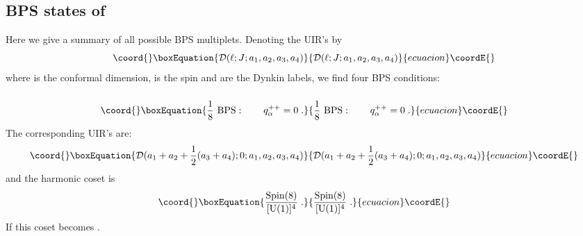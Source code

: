 \documentclass[a4paper,12pt]{article}
\begin{document}
\subsection{BPS states of \coordHE{}}

Here we give a summary of all possible 
\coordHE{} BPS multiplets. Denoting the UIR's by 
\begin{equation}\coord{}\boxEquation{\label{7.39}
  {\cal D}(\ell;J;a_1,a_2,a_3,a_4)
}{{\cal D}(\ell;J;a_1,a_2,a_3,a_4)
}{ecuacion}\coordE{}\end{equation}
where \myHighlight{$\ell$}\coordHE{} is the conformal dimension, \coordHE{} is the spin and 
\coordHE{} are the \coordHE{} Dynkin labels, we find 
four BPS conditions: 

\subsubsection{} 

\begin{equation}\coord{}\boxEquation{\label{8.14}
  {1\over 8}\ \mbox{BPS}:\qquad  q_\alpha^{++} =0\;.  
}{{1\over 8}\ \mbox{BPS}:\qquad  q_\alpha^{++} =0\;.  
}{ecuacion}\coordE{}\end{equation}
The corresponding UIR's are: 
\begin{equation}\coord{}\boxEquation{\label{8.15}
  {\cal D}(a_1+a_2 + {1\over 2}(a_3+a_4);0;a_1,a_2,a_3,a_4)
}{{\cal D}(a_1+a_2 + {1\over 2}(a_3+a_4);0;a_1,a_2,a_3,a_4)
}{ecuacion}\coordE{}\end{equation}
and the harmonic coset is 
\begin{equation}\coord{}\boxEquation{\label{8.16}
  {\mbox{Spin}(8)\over [\mbox{U}(1)]^4}\;.
}{{\mbox{Spin}(8)\over [\mbox{U}(1)]^4}\;.
}{ecuacion}\coordE{}\end{equation}
If \coordHE{} this coset becomes 
\coordHE{}. 

\subsubsection{} 
\end{document}
